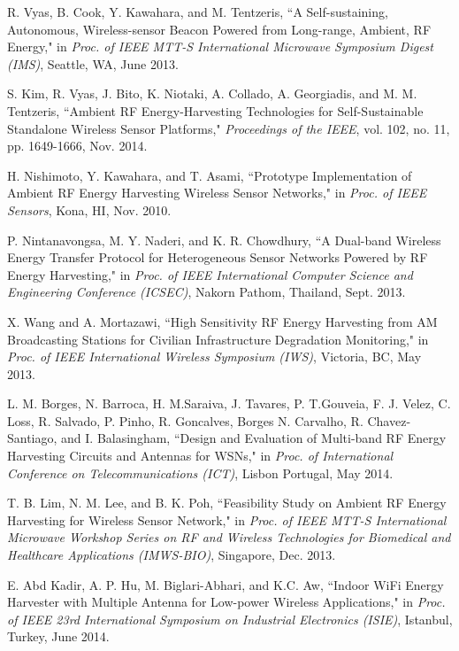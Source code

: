 \documentclass[twocolumn,10pt]{IEEEtran}
\begin{document}
\begin{thebibliography}{99}
R. Vyas, B. Cook, Y. Kawahara, and M. Tentzeris,  
``A Self-sustaining, Autonomous, Wireless-sensor Beacon Powered from Long-range, Ambient, RF Energy," in \emph{Proc. of IEEE MTT-S International Microwave Symposium Digest (IMS)}, Seattle, WA, June 2013.  

S. Kim, R. Vyas, J. Bito, K. Niotaki, A. Collado, A. Georgiadis, and M. M. Tentzeris, ``Ambient RF Energy-Harvesting Technologies for Self-Sustainable Standalone Wireless Sensor Platforms,"   \emph{Proceedings of the IEEE}, vol. 102, no. 11, pp. 1649-1666, Nov. 2014. 

H. Nishimoto, Y. Kawahara, and T. Asami, ``Prototype Implementation of Ambient RF Energy Harvesting Wireless Sensor Networks," in \emph{Proc. of IEEE Sensors}, Kona, HI, Nov. 2010.  

P. Nintanavongsa, M. Y. Naderi, and K. R. Chowdhury, ``A Dual-band Wireless Energy Transfer Protocol for Heterogeneous Sensor Networks Powered by RF Energy Harvesting," in \emph{Proc. of IEEE International Computer Science and Engineering Conference (ICSEC)}, Nakorn Pathom, Thailand, Sept. 2013.

X. Wang and A. Mortazawi, ``High Sensitivity RF Energy Harvesting from AM Broadcasting Stations for Civilian Infrastructure Degradation Monitoring,"
in \emph{Proc. of IEEE International Wireless Symposium (IWS)}, Victoria, BC, May 2013.


L. M. Borges, N. Barroca, H. M.Saraiva, J. Tavares, P. T.Gouveia,  F. J. Velez, C. Loss, R. Salvado,  P. Pinho,  R. Goncalves,  Borges N. Carvalho, R. Chavez-Santiago, and I. Balasingham, ``Design and Evaluation of Multi-band RF Energy Harvesting Circuits and Antennas for WSNs," in \emph{Proc. of International Conference on Telecommunications (ICT)}, Lisbon Portugal, May 2014.

T. B. Lim, N. M. Lee, and B. K. Poh, ``Feasibility Study on Ambient RF Energy Harvesting for Wireless Sensor Network," 
in \emph{Proc. of IEEE MTT-S International Microwave Workshop Series on RF and Wireless Technologies for Biomedical and Healthcare Applications (IMWS-BIO)}, Singapore, Dec. 2013.



E. Abd Kadir, A. P. Hu, M. Biglari-Abhari, and K.C. Aw,  
``Indoor WiFi Energy Harvester with Multiple Antenna for Low-power Wireless Applications," in \emph{Proc. of IEEE 23rd International Symposium on Industrial Electronics (ISIE)}, Istanbul, Turkey, June 2014.
 

\end{thebibliography}
\end{document}
